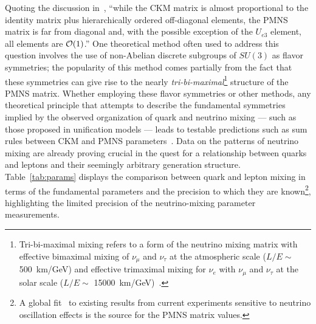 Quoting the discussion in~\cite{deGouvea:2013onf}, ``while the CKM
matrix is almost proportional to the identity matrix plus
hierarchically ordered off-diagonal elements, the PMNS matrix is far
from diagonal and, with the possible exception of the $U_{e3}$
element, all elements are ${\cal O}(1)$.''
One theoretical method often used to address this question involves the use of non-Abelian discrete
subgroups of $SU(3)$ as flavor symmetries; the popularity of this method comes partially from
the fact that these symmetries can give rise to the nearly \emph{tri-bi-maximal}\footnote{Tri-bi-maximal mixing refers to a form of the neutrino mixing matrix with effective bimaximal mixing of $\nu_\mu$ and $\nu_\tau$
at the atmospheric scale ($L/E \sim$ \SI{500}{\km / \GeV}) and effective trimaximal
mixing for $\nu_e$ with $\nu_\mu$ and $\nu_\tau$ 
at the solar scale ($L/E \sim$ \SI{15000}{\km / \GeV})~\cite{Harrison:2002er}.} 
structure of the PMNS matrix.
Whether employing these flavor symmetries or other methods,
any theoretical principle that attempts to describe the fundamental
symmetries implied by the observed organization of quark and neutrino
mixing --- such as those proposed in unification models --- leads to
testable predictions such as sum rules between CKM and PMNS
parameters~\cite{deGouvea:2013onf,Mohapatra:2005wg,King:2014nza,Albright:2006cw}.
%
Data on the patterns of neutrino mixing 
are already proving crucial in the quest for a 
relationship between quarks and leptons and their seemingly arbitrary generation
structure.  
Table~\ref{tab:params} displays the comparison between quark and lepton mixing
in terms of the fundamental parameters 
and the precision to which they are known\footnote{A global fit~\cite{Fogli:2012ua} to 
 existing results from current
 experiments sensitive to neutrino oscillation effects is the source for the PMNS matrix values.}, 
highlighting the limited precision  of the neutrino-mixing parameter measurements.

